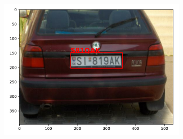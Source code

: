 \begin{figure}
\begin{subfigure}{0.35\textwidth}
        \includegraphics[width=\textwidth]{abbildungen/prediction_02.pdf}
    \end{subfigure}
\end{figure}
